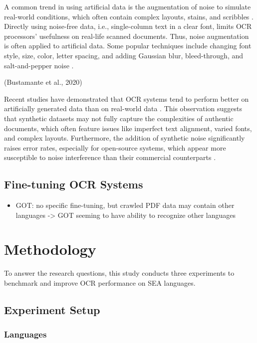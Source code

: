 \documentclass[12pt,oneside]{memoir}
\begin{document}
A common trend in using artificial data is the augmentation of noise to simulate real-world conditions, which often contain complex layouts, stains, and scribbles \parencite{hegghammer-2022}.
Directly using noise-free data, i.e., single-column text in a clear font, limits OCR processors' usefulness on real-life scanned documents.
Thus, noise augmentation is often applied to artificial data.
Some popular techniques include changing font style, size, color, letter spacing, and adding Gaussian blur, bleed-through, and salt-and-pepper noise \parencite{gupte-etal-2021, ignat-etal-2022}.

(Bustamante et al., 2020)

Recent studies have demonstrated that OCR systems tend to perform better on artificially generated data than on real-world data \parencite{ignat-etal-2022}.
This observation suggests that synthetic datasets may not fully capture the complexities of authentic documents, which often feature issues like imperfect text alignment, varied fonts, and complex layouts.
Furthermore, the addition of synthetic noise significantly raises error rates, especially for open-source systems, which appear more susceptible to noise interference than their commercial counterparts \parencite{hegghammer-2022}.


\section{Fine-tuning OCR Systems}

\begin{itemize}
    \item GOT: no specific fine-tuning, but crawled PDF data may contain other languages -> GOT seeming to have ability to recognize other languages
\end{itemize}

\chapter{Methodology}

To answer the research questions, this study conducts three experiments to benchmark and improve OCR performance on SEA languages.

\section{Experiment Setup}

\subsection{Languages}
\end{document}
